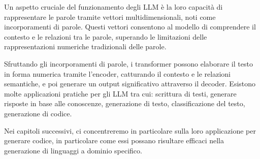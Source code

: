 Un aspetto cruciale del funzionamento degli LLM è la loro capacità di rappresentare le parole tramite vettori multidimensionali, noti come incorporamenti di parole. Questi vettori consentono al modello di comprendere il contesto e le relazioni tra le parole, superando le limitazioni delle rappresentazioni numeriche tradizionali delle parole.

Sfruttando gli incorporamenti di parole, i transformer possono elaborare il testo in forma numerica tramite l'encoder, catturando il contesto e le relazioni semantiche, e poi generare un output significativo attraverso il decoder.
Esistono molte applicazioni pratiche per gli LLM tra cui: scrittura di testi, generare risposte in base alle conoscenze, generazione di testo, classificazione del testo, generazione di codice.

Nei capitoli successivi, ci concentreremo in particolare sulla loro applicazione per generare codice, in particolare come essi possano risultare efficaci nella generazione di linguaggi a dominio specifico.
